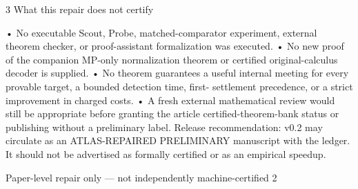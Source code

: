 3 What this repair does not certify

• No executable Scout, Probe, matched-comparator experiment, external theorem checker, or proof-assistant
  formalization was executed.
• No new proof of the companion MP-only normalization theorem or certified original-calculus decoder is supplied.
• No theorem guarantees a useful internal meeting for every provable target, a bounded detection time, first-
  settlement precedence, or a strict improvement in charged costs.
• A fresh external mathematical review would still be appropriate before granting the article certified-theorem-bank
  status or publishing without a preliminary label.
Release recommendation: v0.2 may circulate as an ATLAS-REPAIRED PRELIMINARY manuscript
with the ledger. It should not be advertised as formally certified or as an empirical speedup.




Paper-level repair only — not independently machine-certified                                                     2